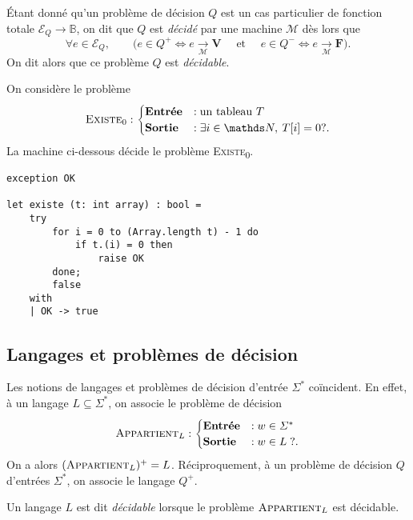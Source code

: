 \begin{defn}
	Étant donné qu'un problème de décision $Q$\/ est un cas particulier de fonction totale $\mathcal{E}_Q \to \mathds{B}$, on dit que $Q$\/ est \textit{décidé} par une machine $\mathcal{M}$\/ dès lors que \[
		\forall e \in \mathcal{E}_Q,\qquad\Big(e \in Q^+ \iff e \xrightarrow[\mathcal{M}]{} \mathbf{V}\quad\text{ et }\quad e \in Q^- \iff e \xrightarrow[\mathcal{M}]{} \mathbf{F}\Big)
	.\] On dit alors que ce problème $Q$\/ est \textit{décidable}.
\end{defn}

\begin{exm}
	On considère le problème \[
		\text{\textsc{Existe}\textsubscript0} :\begin{cases}
			\text{\textbf{Entrée}} &: \text{un tableau } T\\
			\text{\textbf{Sortie}} &: \exists i \in \N,\: T[i] = 0 ?.
		\end{cases}
	\]
	La machine ci-dessous décide le problème \textsc{Existe}\textsubscript0.
	\begin{lstlisting}[language=caml,caption=Machine décide le problème \textsc{Existe}\textsubscript0]
exception OK

let existe (t: int array) : bool =
	try
		for i = 0 to (Array.length t) - 1 do
			if t.(i) = 0 then
				raise OK
		done;
		false
	with
	| OK -> true
	\end{lstlisting}
\end{exm}

\subsection{Langages et problèmes de décision}

Les notions de langages et problèmes de décision d'entrée $\Sigma^*$\/ coïncident. En effet, à un langage $L \subseteq \Sigma^*$, on associe le problème de décision \[
	\text{\textsc{Appartient}}_L : \begin{cases}
		\text{\textbf{Entrée}}&: w \in \Sigma^*\\
		\text{\textbf{Sortie}}&: w \in L\;?.
	\end{cases}
\]
On a alors $(\text{\textsc{Appartient}}_L)^+ = L$. Réciproquement, à un problème de décision $Q$\/ d'entrées $\Sigma^*$, on associe le langage $Q^+$.

\begin{defn}
	Un langage $L$\/ est dit \textit{décidable} lorsque le problème $\text{\textsc{Appartient}}_L$ est décidable.
\end{defn}

